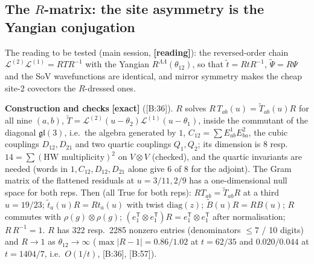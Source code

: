 \documentclass[10pt]{article}
\newcommand{\cl}[2]{\textsf{[#1:#2]}}
\newcommand{\tg}[1]{\textbf{[#1]}}
\begin{document}
\subsection{The $R$-matrix: the site asymmetry is the Yangian conjugation}\label{sec:BR}

The reading to be tested (main session, \tg{reading}): the reversed-order chain $\mathcal L^{(2)}\mathcal L^{(1)}=RTR^{-1}$ with the Yangian $R^{\Lambda\Lambda}(\theta_{12})$, so that $\tilde t=RtR^{-1}$, $\tilde\Psi=R\Psi$ and the SoV wavefunctions are identical, and mirror symmetry makes the cheap site-2 covectors the $R$-dressed ones.

\textbf{Construction and checks} \tg{exact} (\cl{B}{36}). $R$ solves $R\,T_{ab}(u)=\tilde T_{ab}(u)R$ for all nine $(a,b)$, $\tilde T=\mathcal L^{(2)}(u-\theta_2)\mathcal L^{(1)}(u-\theta_1)$, inside the commutant of the diagonal $\mathfrak{gl}(3)$, i.e.\ the algebra generated by $1$, $C_{12}=\sum E^1_{ab}E^2_{ba}$, the cubic couplings $D_{12},D_{21}$ and two quartic couplings $Q_1,Q_2$; its dimension is $8$ resp.\ $14=\sum(\text{HW multiplicity})^2$ on $V\otimes V$ (checked), and the quartic invariants are needed (words in $1,C_{12},D_{12},D_{21}$ alone give 6 of 8 for the adjoint). The Gram matrix of the flattened residuals at $u=3/11,2/9$ has a one-dimensional null space for both reps. Then (all True for both reps): $RT_{ab}=\tilde T_{ab}R$ at a third $u=19/23$; $\tilde t_a(u)R=Rt_a(u)$ with twist $\mathrm{diag}(z)$; $\tilde B(u)R=RB(u)$; $R$ commutes with $\rho(g)\otimes\rho(g)$; $(e_1^{\mathsf T}\otimes e_1^{\mathsf T})R=e_1^{\mathsf T}\otimes e_1^{\mathsf T}$ after normalisation; $R\,R^{-1}=1$. $R$ has 322 resp.\ 2285 nonzero entries (denominators $\le7$ / 10 digits) and $R\to1$ as $\theta_{12}\to\infty$ ($\max|R-1|=0.86/1.02$ at $t=62/35$ and $0.020/0.044$ at $t=1404/7$, i.e.\ $O(1/t)$, \cl{B}{36}, \cl{B}{57}).
\end{document}
